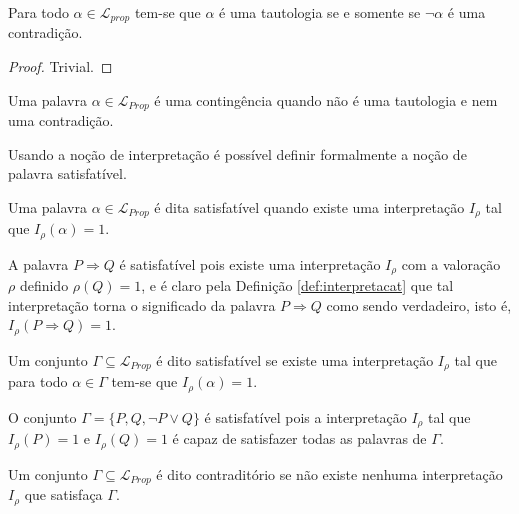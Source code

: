 \begin{prop}
    Para todo $\alpha \in \mathcal{L}_{prop}$ tem-se que $\alpha$ é uma tautologia se e somente se $\neg \alpha$ é uma contradição.
\end{prop}

\begin{proof}
  Trivial.
\end{proof}

\begin{definition}[Contingência]
    Uma palavra $\alpha \in \mathcal{L}_{Prop}$ é uma contingência quando não é uma tautologia e nem uma contradição.
\end{definition}

Usando a noção de interpretação é possível definir formalmente a noção de palavra satisfatível.

\begin{definition}
    Uma palavra $\alpha \in \mathcal{L}_{Prop}$ é dita satisfatível quando existe uma interpretação $I_\rho$ tal que $I_\rho(\alpha) = 1$.
\end{definition}

\begin{exem}
    A palavra $P \Rightarrow Q$ é satisfatível pois existe uma interpretação $I_\rho$ com a valoração $\rho$ definido $\rho(Q) = 1$, e é claro pela Definição \ref{def:interpretacat} que tal interpretação torna o significado da palavra $P \Rightarrow Q$ como sendo verdadeiro, isto é, $I_\rho(P \Rightarrow Q) = 1$.
\end{exem}

\begin{definition}
    Um conjunto $\Gamma \subseteq \mathcal{L}_{Prop}$ é dito satisfatível se existe uma interpretação $I_\rho$ tal que para todo $\alpha \in \Gamma$ tem-se que $I_\rho(\alpha) = 1$.
\end{definition}

\begin{exem}
    O conjunto $\Gamma = \{P, Q, \neg P \lor Q\}$ é satisfatível pois a interpretação $I_\rho$ tal que $I_\rho(P) = 1$ e $I_\rho(Q) = 1$ é capaz de satisfazer todas as palavras de $\Gamma$.
\end{exem}

\begin{definition}
    Um conjunto $\Gamma \subseteq \mathcal{L}_{Prop}$ é dito contraditório se não existe nenhuma interpretação $I_\rho$ que satisfaça $\Gamma$.
\end{definition}

